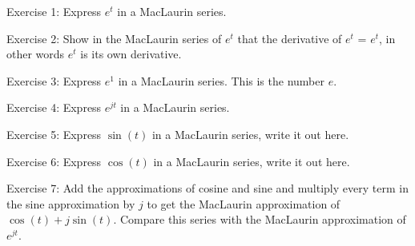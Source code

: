 \documentclass[11pt,letterpaper]{article}
\begin{document}
Exercise 1: Express $e^t$ in a MacLaurin series.

Exercise 2: Show in the MacLaurin series of $e^t$ that the derivative of  $e^t$ =  $e^t$, in other words $e^t$ is its own derivative.


Exercise 3: Express $e^1$ in a MacLaurin series. This is the number $e$.


Exercise 4: Express $e^{jt}$  in a MacLaurin series.


Exercise 5: Express $\sin(t)$ in a MacLaurin series, write it out here.


Exercise 6: Express $\cos(t)$ in a MacLaurin series, write it out here.


Exercise 7: Add the approximations of cosine and sine and multiply every term in the sine approximation by $j$ to get the MacLaurin approximation of $\cos(t) + j \sin(t)$. Compare this series with the MacLaurin approximation of $e^{jt}$.
\end{document}
